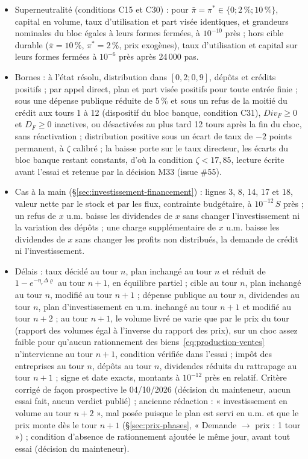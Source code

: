 \documentclass[11pt,a4paper]{article}
\begin{document}
\begin{proposee}
\begin{itemize}
\item Superneutralité (conditions C15 et C30) : pour $\bar\pi = \pi^\ast \in \{0 ; 2\,\% ; 10\,\%\}$, capital en volume, taux d'utilisation et part visée identiques, et grandeurs nominales du bloc égales à leurs formes fermées, à $10^{-10}$ près ; hors cible durable ($\bar\pi = 10\,\%$, $\pi^\ast = 2\,\%$, prix exogènes), taux d'utilisation et capital sur leurs formes fermées à $10^{-6}$ près après 24\,000 pas.
\item Bornes : à l'état résolu, distribution dans $[0{,}2 ; 0{,}9]$, dépôts et crédits positifs ; par appel direct, plan et part visée positifs pour toute entrée finie ; sous une dépense publique réduite de 5\,\% et sous un refus de la moitié du crédit aux tours 1 à 12 (dispositif du bloc banque, condition C31), $\mathit{Div}_F \ge 0$ et $D_F \ge 0$ inactives, ou désactivées au plus tard 12 tours après la fin du choc, sans réactivation ; distribution positive sous un écart de taux de $-2$ points permanent, à $\zeta$ calibré ; la baisse porte sur le taux directeur, les écarts du bloc banque restant constants, d'où la condition $\zeta < 17{,}85$, lecture écrite avant l'essai et retenue par la décision M33 (issue \#55).
\item Cas à la main (\S\ref{sec:investissement-financement}) : lignes 3, 8, 14, 17 et 18, valeur nette par le stock et par les flux, contrainte budgétaire, à $10^{-12}\,S$ près ; un refus de $x$ u.m. baisse les dividendes de $x$ sans changer l'investissement ni la variation des dépôts ; une charge supplémentaire de $x$ u.m. baisse les dividendes de $x$ sans changer les profits non distribués, la demande de crédit ni l'investissement.
\item Délais : taux décidé au tour $n$, plan inchangé au tour $n$ et réduit de $1 - e^{-\eta_r\Delta\varrho}$ au tour $n + 1$, en équilibre partiel ; cible au tour $n$, plan inchangé au tour $n$, modifié au tour $n + 1$ ; dépense publique au tour $n$, dividendes au tour $n$, plan d'investissement en u.m. inchangé au tour $n + 1$ et modifié au tour $n + 2$ ; au tour $n + 1$, le volume livré ne varie que par le prix du tour (rapport des volumes égal à l'inverse du rapport des prix), sur un choc assez faible pour qu'aucun rationnement des biens~\eqref{eq:production-ventes} n'intervienne au tour $n + 1$, condition vérifiée dans l'essai ; impôt des entreprises au tour $n$, dépôts au tour $n$, dividendes réduits du rattrapage au tour $n + 1$ ; signe et date exacts, montants à $10^{-12}$ près en relatif. Critère corrigé de façon prospective le 04/10/2026 (décision du mainteneur, aucun essai fait, aucun verdict publié) ; ancienne rédaction : « investissement en volume au tour $n + 2$ », mal posée puisque le plan est servi en u.m. et que le prix monte dès le tour $n + 1$ (\S\ref{sec:prix-phases}, « Demande $\to$ prix : 1 tour ») ; condition d'absence de rationnement ajoutée le même jour, avant tout essai (décision du mainteneur).

\end{itemize}
\end{proposee}
\end{document}
